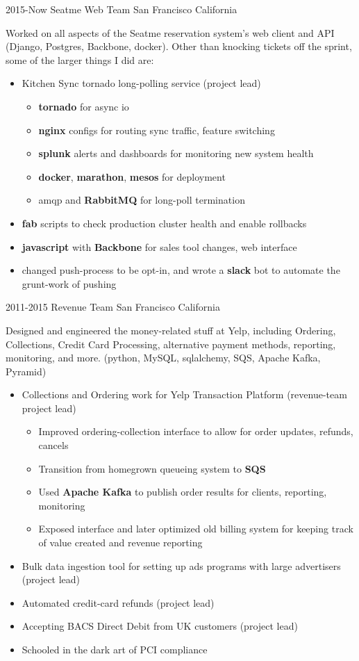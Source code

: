 \documentclass[]{friggeri-cv} %
\begin{document}
\begin{entrylist}


\entry
{2015-Now}
{Seatme Web Team}
{San Francisco California}
{
Worked on all aspects of the Seatme reservation system's web client and API (Django, Postgres, Backbone, docker). Other than knocking tickets off the sprint, some of the larger things I did are:\\
\begin{itemize}
\item Kitchen Sync tornado long-polling service (project lead)
\begin{itemize}
\item \textbf{tornado} for async io
\item \textbf{nginx} configs for routing sync traffic, feature switching
\item \textbf{splunk} alerts and dashboards for monitoring new system health
\item \textbf{docker}, \textbf{marathon}, \textbf{mesos} for deployment
\item amqp and \textbf{RabbitMQ} for long-poll termination
\end{itemize}
\item \textbf{fab} scripts to check production cluster health and enable rollbacks
\item \textbf{javascript} with \textbf{Backbone} for sales tool changes, web interface
\item changed push-process to be opt-in, and wrote a \textbf{slack} bot to automate the grunt-work of pushing
\end{itemize}}

\entry
{2011-2015}
{Revenue Team}
{San Francisco California}
{
Designed and engineered the money-related stuff at Yelp, including Ordering, Collections, Credit Card Processing, alternative payment methods, reporting, monitoring, and more. (python, MySQL, sqlalchemy, SQS, Apache Kafka, Pyramid)
\begin{itemize}
\item Collections and Ordering work for Yelp Transaction Platform (revenue-team project lead)
\begin{itemize}
\item Improved ordering-collection interface to allow for order updates, refunds, cancels
\item Transition from homegrown queueing system to \textbf{SQS}
\item Used \textbf{Apache Kafka} to publish order results for clients, reporting, monitoring
\item Exposed interface and later optimized old billing system for keeping track of value created and revenue reporting
\end{itemize}
\item Bulk data ingestion tool for setting up ads programs with large advertisers (project lead)
\item Automated credit-card refunds (project lead)
\item Accepting BACS Direct Debit from UK customers (project lead)
\item Schooled in the dark art of PCI compliance


\end{itemize}}
\end{entrylist}
\end{document}
